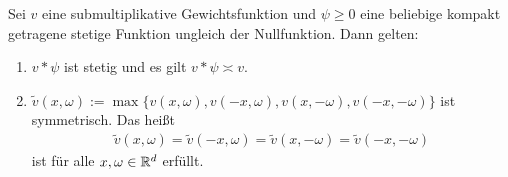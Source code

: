 \newpage
\begin{lem}\label{th:submult_cont_symm}
	Sei $ v $ eine submultiplikative Gewichtsfunktion und $ \psi \geq 0  $ eine beliebige kompakt getragene stetige Funktion ungleich der Nullfunktion.
	Dann gelten:
	\vspace{-0.1cm}
	\begin{enumerate}[label =\textbf{(\roman*)}]
		\item $ v \ast \psi $ ist stetig und es gilt $ v \ast \psi \asymp v $.
		\item $ \tilde{v}(x,\omega) := \max\lbrace v(x,\omega),v(-x,\omega), v(x,-\omega), v(-x,-\omega) \rbrace$ ist symmetrisch. Das heißt
		\begin{align}
		\tilde{v}(x, \omega)
		= 
		\tilde{v}(-x,\omega)
		=
		\tilde{v}(x,-\omega)
		=
		\tilde{v}(-x,-\omega)
		\end{align} 
		ist für alle $ x,\omega \in \mathbb{R}^d $ erfüllt.
	\end{enumerate} 
\end{lem}

